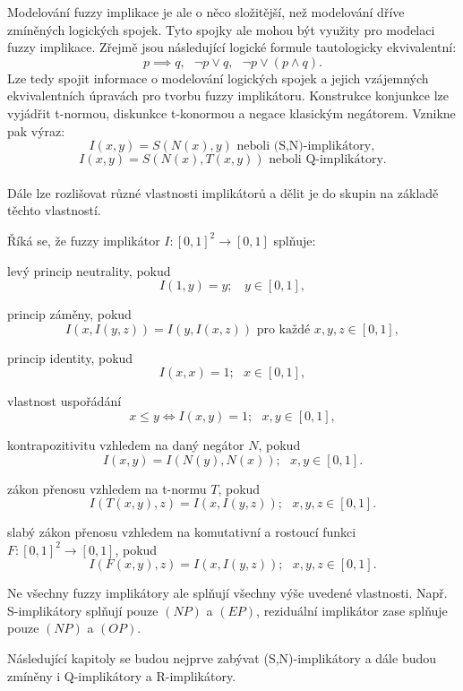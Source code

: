 Modelov\'an\'i fuzzy implikace je ale o něco složitější, než modelov\'an\'i dříve zmíněných logických spojek. Tyto spojky ale mohou být využity pro modelaci fuzzy implikace. Zřejmě jsou následující logické formule tautologicky ekvivalentní: $$ p\implies q, \mbox{   } \neg p \vee q, \mbox{   } \neg p\vee (p\wedge q) .$$ Lze tedy spojit informace o modelov\'an\'i logických spojek a jejich vzájemných ekvivalentních \' upravách pro tvorbu fuzzy implikátoru. Konstrukce konjunkce lze vyjádřit t-normou, diskunkce t-konormou a negace klasickým negátorem. Vznikne pak výraz:$$I(x,y)=S(N(x),y)\text{ neboli (S,N)-implikátory},$$
$$I(x,y)=S(N(x),T(x,y)) \text{ neboli Q-implikátory}.$$\\

Dále lze rozlišovat r\r uzné vlastnosti implikátor\r u a dělit je do skupin na základě těchto vlastností.
\begin{definition}
\cite{Springer}
Říká se, že fuzzy implik\'ator $I:[0,1]^2 \rightarrow [0,1]$ spl\v nuje:
\begin{enumerate}
\item[(NP)] levý princip neutrality, pokud
$$I(1,y)=y; ~~~~y \in [0,1],$$
\item[(EP)] princip z\'aměny, pokud
$$I(x,I(y,z))=I(y,I(x,z)) \mbox{  pro ka\v zd\'e   } x,y,z \in [0,1],$$
\item[(IP)] princip identity, pokud
$$I(x,x) = 1; ~~~ x \in [0,1], $$
\item[(OP)] vlastnost uspořádání
$$x \leq y \iff I(x,y) =1; ~~~ x,y \in [0,1],$$
\item[(CP)] kontrapozitivitu vzhledem na dan\'y neg\'ator $N$, pokud
$$ I(x,y)=I(N(y),N(x)); ~~~ x,y \in [0,1].$$
 {\item[(LI)] z\'akon přenosu  vzhledem na  t-normu $T$, pokud
$$I(T(x, y), z) = I(x, I(y, z)); ~~~ x,y,z \in  [0, 1].$$
\item[(WLI)]  slab\'y z\'akon přenosu vzhledem na komutativní a
rostoucí funkci $F:
[0,1]^2 \to [0, 1]$, pokud
$$I(F(x, y), z) = I(x, I(y, z)); ~~~  x,y,z \in  [0, 1].$$}
\end{enumerate}
\end{definition}
Ne všechny fuzzy implikátory ale spl\v nují všechny výše uvedené vlastnosti. Např. S-implikátory spl\v nují pouze $(NP)$ a $(EP)$, reziduální implikátor zase spl\v nuje pouze $(NP)$ a $(OP).$

Následující kapitoly se budou nejprve zabývat (S,N)-implikátory a dále budou zmíněny i Q-implikátory a R-implikátory. 

